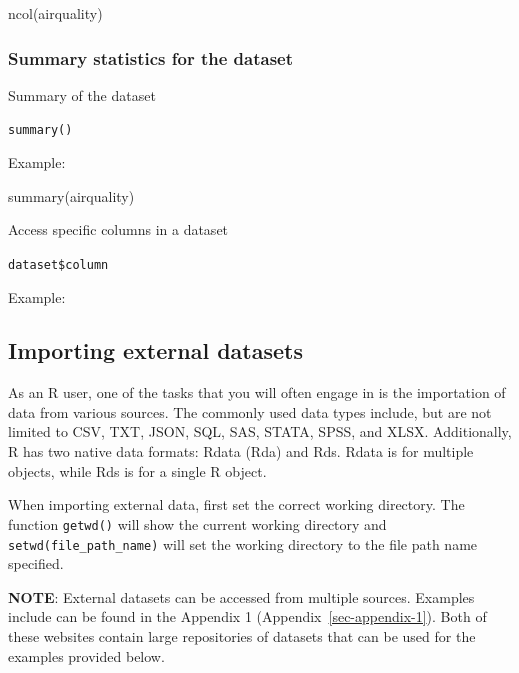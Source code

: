 \documentclass[
  letterpaper,
  DIV=11,
  numbers=noendperiod]{scrreprt}
\newenvironment{Shaded}{}{}
\newcommand{\FunctionTok}[1]{\textcolor[rgb]{0.44,0.26,0.76}{#1}}
\newcommand{\NormalTok}[1]{\textcolor[rgb]{0.14,0.16,0.18}{#1}}
\newcommand{\SpecialCharTok}[1]{\textcolor[rgb]{0.00,0.36,0.77}{#1}}
\begin{document}
\begin{Shaded}
\begin{Highlighting}[]
\FunctionTok{ncol}\NormalTok{(airquality)}
\end{Highlighting}
\end{Shaded}

\subsubsection{Summary statistics for the
dataset}\label{summary-statistics-for-the-dataset}

Summary of the dataset

\texttt{summary()}

Example:

\begin{Shaded}
\begin{Highlighting}[]
\FunctionTok{summary}\NormalTok{(airquality)}
\end{Highlighting}
\end{Shaded}

Access specific columns in a dataset

\texttt{dataset\$column}

Example:

\begin{Shaded}
\end{Shaded}

\subsection{Importing external
datasets}\label{importing-external-datasets}

As an R user, one of the tasks that you will often engage in is the
importation of data from various sources. The commonly used data types
include, but are not limited to CSV, TXT, JSON, SQL, SAS, STATA, SPSS,
and XLSX. Additionally, R has two native data formats: Rdata (Rda) and
Rds. Rdata is for multiple objects, while Rds is for a single R object.

When importing external data, first set the correct working directory.
The function \texttt{getwd()} will show the current working directory
and \texttt{setwd(file\_path\_name)} will set the working directory to
the file path name specified.

\textbf{NOTE}: External datasets can be accessed from multiple sources.
Examples include can be found in the Appendix 1
(Appendix~\ref{sec-appendix-1}). Both of these websites contain large
repositories of datasets that can be used for the examples provided
below.
\end{document}
